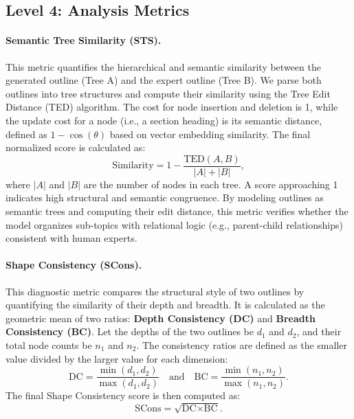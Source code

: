 \documentclass[11pt]{article}
\begin{document}
\subsection{Level 4: Analysis Metrics}
\paragraph{Semantic Tree Similarity (STS).}
This metric quantifies the hierarchical and semantic similarity between the generated outline (Tree A) and the expert outline (Tree B). We parse both outlines into tree structures and compute their similarity using the Tree Edit Distance (TED) algorithm. The cost for node insertion and deletion is 1, while the update cost for a node (i.e., a section heading) is its semantic distance, defined as \(1 - \cos(\theta)\) based on vector embedding similarity. The final normalized score is calculated as:
{
\setlength{\abovedisplayskip}{6pt}%
\setlength{\belowdisplayskip}{6pt}%
\begin{equation}
\text{Similarity} = 1 - \frac{\text{TED}(A, B)}{|A| + |B|},
\end{equation}
}
where \(|A|\) and \(|B|\) are the number of nodes in each tree. A score approaching 1 indicates high structural and semantic congruence. By modeling outlines as semantic trees and computing their edit distance, this metric verifies whether the model organizes sub-topics with relational logic (e.g., parent-child relationships) consistent with human experts.


\paragraph{Shape Consistency (SCons).}
This diagnostic metric compares the structural style of two outlines by quantifying the similarity of their depth and breadth. It is calculated as the geometric mean of two ratios: \textbf{Depth Consistency (DC)} and \textbf{Breadth Consistency (BC)}. Let the depths of the two outlines be $d_1$ and $d_2$, and their total node counts be $n_1$ and $n_2$. The consistency ratios are defined as the smaller value divided by the larger value for each dimension:
{
\setlength{\abovedisplayskip}{6pt}%
\setlength{\belowdisplayskip}{6pt}%
\begin{equation}
    \text{DC} = \frac{\min(d_1, d_2)}{\max(d_1, d_2)} \quad \text{and} \quad \text{BC} = \frac{\min(n_1, n_2)}{\max(n_1, n_2)}.
\end{equation}
}
The final Shape Consistency score is then computed as:
{
\setlength{\abovedisplayskip}{6pt}%
\setlength{\belowdisplayskip}{6pt}%
\begin{equation}
    \text{SCons} = \sqrt{\text{DC} \times \text{BC}}.
\end{equation}
}
\end{document}
